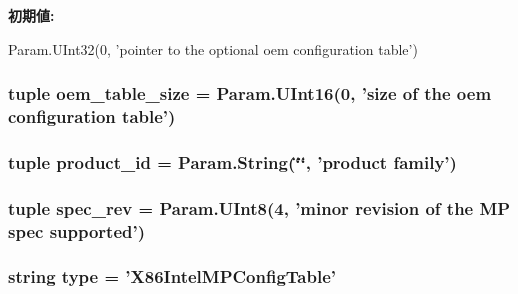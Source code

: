 \label{classIntelMP_1_1X86IntelMPConfigTable_a6d9a21684fc320fcfbe4b209dbfb90af}
{\bfseries 初期値:}
\begin{DoxyCode}
Param.UInt32(0,
            'pointer to the optional oem configuration table')
\end{DoxyCode}
\hypertarget{classIntelMP_1_1X86IntelMPConfigTable_a29d3f23f1a8d13bdc245223bd853609f}{
\subsubsection[{oem\_\-table\_\-size}]{\setlength{\rightskip}{0pt plus 5cm}tuple {\bf oem\_\-table\_\-size} = Param.UInt16(0, 'size of the oem configuration table')}}
\label{classIntelMP_1_1X86IntelMPConfigTable_a29d3f23f1a8d13bdc245223bd853609f}
\hypertarget{classIntelMP_1_1X86IntelMPConfigTable_a020c640aa066b041f10ab7eb9b2c146e}{
\subsubsection[{product\_\-id}]{\setlength{\rightskip}{0pt plus 5cm}tuple {\bf product\_\-id} = Param.String(\char`\"{}\char`\"{}, 'product family')}}
\label{classIntelMP_1_1X86IntelMPConfigTable_a020c640aa066b041f10ab7eb9b2c146e}
\hypertarget{classIntelMP_1_1X86IntelMPConfigTable_a524402a2c5b41fc09fdbe3ecc1c95abb}{
\subsubsection[{spec\_\-rev}]{\setlength{\rightskip}{0pt plus 5cm}tuple {\bf spec\_\-rev} = Param.UInt8(4, 'minor revision of the MP spec supported')}}
\label{classIntelMP_1_1X86IntelMPConfigTable_a524402a2c5b41fc09fdbe3ecc1c95abb}
\hypertarget{classIntelMP_1_1X86IntelMPConfigTable_acce15679d830831b0bbe8ebc2a60b2ca}{
\subsubsection[{type}]{\setlength{\rightskip}{0pt plus 5cm}string {\bf type} = '{\bf X86IntelMPConfigTable}'}}
\label{classIntelMP_1_1X86IntelMPConfigTable_acce15679d830831b0bbe8ebc2a60b2ca}


